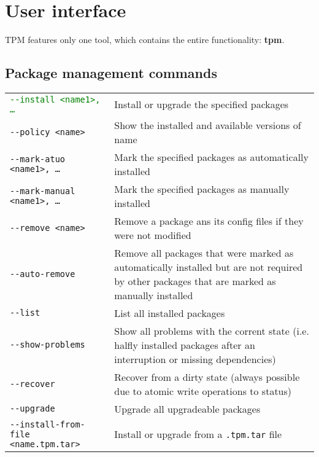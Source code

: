 \documentclass[a4paper]{article}
\newcommand{\program}[1]{\textbf{#1}}
\newcommand{\green}[1]{\textcolor{green}{#1}}
\begin{document}
	\section{User interface}
	\label{sec:user_interface}
	
	TPM features only one tool, which contains the entire functionality: \program{tpm}.
	
	\subsection{Package management commands}
	\label{sec:package_management_commands}
	
	\bgroup
	\def\arraystretch{1.5}
	\begin{tabularx}{\textwidth}{lX}
		\green{\texttt{-{}-install <name1>, \dots}} & Install or upgrade the specified packages \\
		
		\texttt{-{}-policy <name>} & Show the installed and available versions of name \\
		
		\texttt{-{}-mark-atuo <name1>, \dots} & Mark the specified packages as automatically installed \\
		
		\texttt{-{}-mark-manual <name1>, \dots} & Mark the specified packages as manually installed \\
		
		\texttt{-{}-remove <name>} & Remove a package ans its config files if they were not modified \\
		
		\texttt{-{}-auto-remove} & Remove all packages that were marked as automatically installed but are not required by other packages that are marked as manually installed \\
		
		\texttt{-{}-list} & List all installed packages \\
		
		\texttt{-{}-show-problems} & Show all problems with the corrent state (i.e. halfly installed packages after an interruption or missing dependencies) \\
		
		\texttt{-{}-recover} & Recover from a dirty state (always possible due to atomic write operations to status) \\
		
		\texttt{-{}-upgrade} & Upgrade all upgradeable packages \\
		
		\texttt{-{}-install-from-file <name.tpm.tar>} & Install or upgrade from a \texttt{.tpm.tar} file \\
	\end{tabularx}
	\egroup
\end{document}
